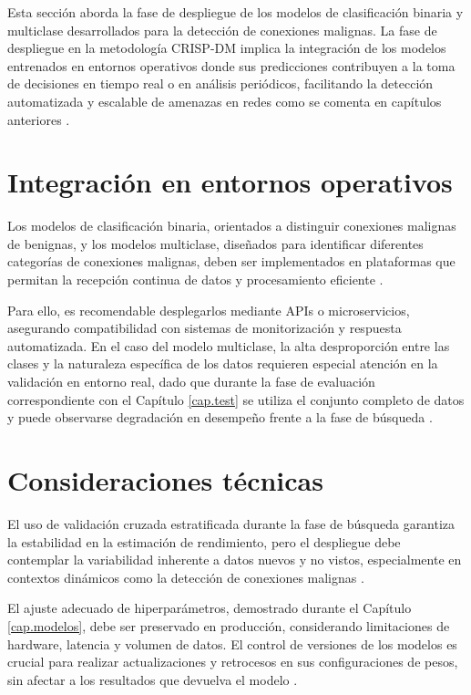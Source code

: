 Esta sección aborda la fase de despliegue de los modelos de clasificación binaria y multiclase desarrollados para la detección de conexiones malignas. La fase de despliegue en la metodología CRISP-DM implica la integración de los modelos entrenados en entornos operativos donde sus predicciones contribuyen a la toma de decisiones en tiempo real o en análisis periódicos, facilitando la detección automatizada y escalable de amenazas en redes como se comenta en capítulos anteriores \cite{wirth2000crisp}.

\section{Integración en entornos operativos}

Los modelos de clasificación binaria, orientados a distinguir conexiones malignas de benignas, y los modelos multiclase, diseñados para identificar diferentes categorías de conexiones malignas, deben ser implementados en plataformas que permitan la recepción continua de datos y procesamiento eficiente \cite{baylor2017tensorflow}. 

Para ello, es recomendable desplegarlos mediante APIs o microservicios, asegurando compatibilidad con sistemas de monitorización y respuesta automatizada. En el caso del modelo multiclase, la alta desproporción entre las clases y la naturaleza específica de los datos requieren especial atención en la validación en entorno real, dado que durante la fase de evaluación correspondiente con el Capítulo \ref{cap.test} se utiliza el conjunto completo de datos y puede observarse degradación en desempeño frente a la fase de búsqueda \cite{gama2014survey}.

\section{Consideraciones técnicas}

El uso de validación cruzada estratificada durante la fase de búsqueda garantiza la estabilidad en la estimación de rendimiento, pero el despliegue debe contemplar la variabilidad inherente a datos nuevos y no vistos, especialmente en contextos dinámicos como la detección de conexiones malignas \cite{reimers2017optimal}. 

El ajuste adecuado de hiperparámetros, demostrado durante el Capítulo \ref{cap.modelos}, debe ser preservado en producción, considerando limitaciones de hardware, latencia y volumen de datos. El control de versiones de los modelos es crucial para realizar actualizaciones y retrocesos en sus configuraciones de pesos, sin afectar a los resultados que devuelva el modelo \cite{peters2017machine}.

